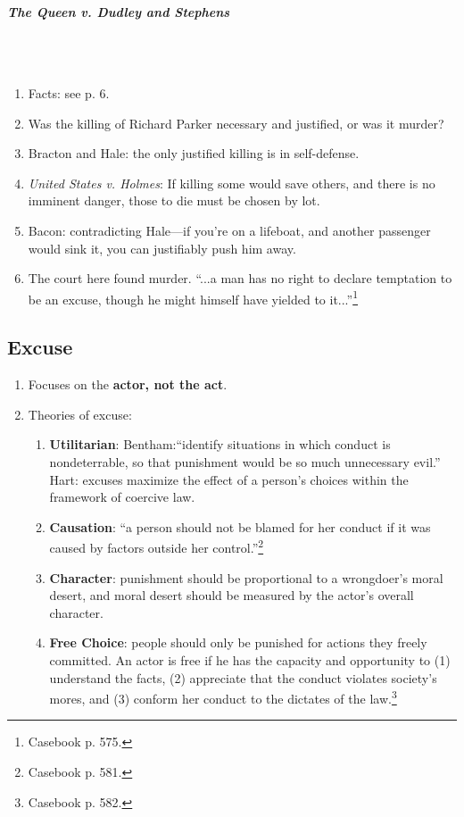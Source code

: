 \paragraph{\emph{The Queen v. Dudley and Stephens}}
~\\\\
\begin{enumerate}
    \item Facts: see p. 6.
    \item Was the killing of Richard Parker necessary and justified, or was it 
    murder?
    \item Bracton and Hale: the only justified killing is in self-defense.
    \item \emph{United States v. Holmes}: If killing some would save others, 
    and there is no imminent danger, those to die must be chosen by lot.
    \item Bacon: contradicting Hale---if you're on a lifeboat, and another 
    passenger would sink it, you can justifiably push him away.
    \item The court here found murder. ``...a man has no right to declare 
    temptation to be an excuse, though he might himself have yielded to 
    it...''\footnote{Casebook p. 575.}
\end{enumerate}

\subsection{Excuse}

\begin{enumerate}
    \item Focuses on the \textbf{actor, not the act}.
    \item Theories of excuse:
    \begin{enumerate}
        \item \textbf{Utilitarian}: Bentham:``identify situations in which 
        conduct is nondeterrable, so that punishment would be so much 
        unnecessary evil.'' Hart: excuses maximize the effect of a person's 
        choices within the framework of coercive law.
        \item \textbf{Causation}: ``a person should not be blamed for her 
        conduct if it was caused by factors outside her 
        control.''\footnote{Casebook p. 581.}
        \item \textbf{Character}: punishment should be proportional to a 
        wrongdoer's moral desert, and moral desert should be measured by the 
        actor's overall character.
        \item \textbf{Free Choice}: people should only be punished for actions 
        they freely committed. An actor is free if he has the capacity and 
        opportunity to (1) understand the facts, (2) appreciate that the 
        conduct violates society's mores, and (3) conform her conduct to the 
        dictates of the law.\footnote{Casebook p. 582.}
    \end{enumerate}
\end{enumerate}

